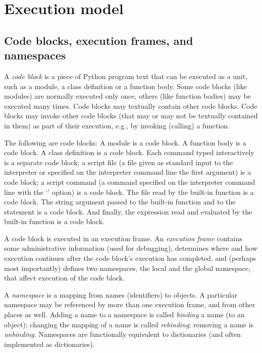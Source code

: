 \chapter{Execution model}

\section{Code blocks, execution frames, and namespaces} \label{execframes}

A {\em code block} is a piece of Python program text that can be
executed as a unit, such as a module, a class definition or a function
body.  Some code blocks (like modules) are normally executed only once, others
(like function bodies) may be executed many times.  Code blocks may
textually contain other code blocks.  Code blocks may invoke other
code blocks (that may or may not be textually contained in them) as
part of their execution, e.g., by invoking (calling) a function.

The following are code blocks: A module is a code block.  A function
body is a code block.  A class definition is a code block.  Each
command typed interactively is a separate code block; a script file (a
file given as standard input to the interpreter or specified on the
interpreter command line the first argument) is a code block; a script
command (a command specified on the interpreter command line with the
`' option) is a code block.  The file read by the built-in
function  is a code block.  The string argument
passed to the built-in function  and to the
 statement is a code block.  And finally, the expression
read and evaluated by the built-in function  is a
code block.

A code block is executed in an execution frame.  An {\em execution
frame} contains some administrative information (used for debugging),
determines where and how execution continues after the code block's
execution has completed, and (perhaps most importantly) defines two
namespaces, the local and the global namespace, that affect
execution of the code block.

A {\em namespace} is a mapping from names (identifiers) to objects.
A particular namespace may be referenced by more than one execution
frame, and from other places as well.  Adding a name to a namespace
is called {\em binding} a name (to an object); changing the mapping of
a name is called {\em rebinding}; removing a name is {\em unbinding}.
Namespaces are functionally equivalent to dictionaries (and often
implemented as dictionaries).

